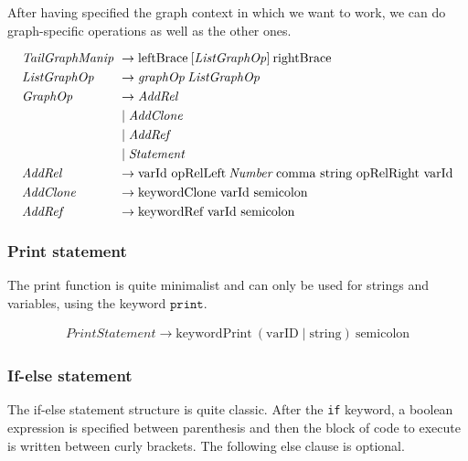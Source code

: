 After having specified the graph context in which we want to work, we can do graph-specific operations as well as the other ones.

\begin{align*}
    \omit $\mathit{TailGraphManip}$ \hfil &\rightarrow \text{leftBrace} \: [\mathit{ListGraphOp}]  \: \text{rightBrace} \\
    \omit $\mathit{ListGraphOp}$ \hfil &\rightarrow \mathit{graphOp} \: \mathit{ListGraphOp} \\
    \omit $\mathit{GraphOp}$ \hfil &\rightarrow \mathit{AddRel}  \\
    & \mid \mathit{AddClone} \\
    & \mid \mathit{AddRef} \\
    & \mid \mathit{Statement} \\
    \omit $\mathit{AddRel}$ \hfil & \rightarrow \text{varId opRelLeft} \: \mathit{Number} \: \text{comma string opRelRight varId} \\
    \omit $\mathit{AddClone}$ \hfil & \rightarrow \text{keywordClone varId semicolon} \\
    \omit $\mathit{AddRef}$ \hfil & \rightarrow \text{keywordRef varId semicolon}
\end{align*}

\subsubsection*{Print statement}

The print function is quite minimalist and can only be used for strings and variables, using the keyword $\texttt{print}$.

\begin{align*}
    \mathit{PrintStatement} \rightarrow \text{keywordPrint} \: (\text{varID} \mid \text{string}) \: \text{semicolon}
\end{align*}

\subsubsection*{If-else statement}

The if-else statement structure is quite classic.
After the \texttt{if} keyword, a boolean expression is specified between parenthesis and then the block of code to execute is written between curly brackets.
The following else clause is optional.

